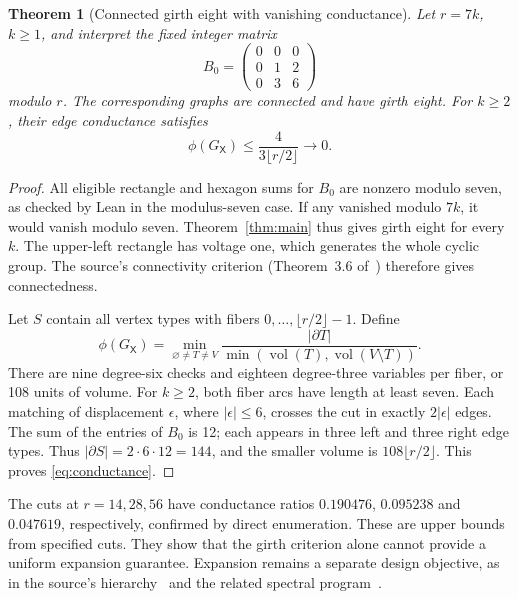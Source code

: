 \documentclass[11pt]{article}
\newtheorem{theorem}{Theorem}[section]
\theoremstyle{definition}
\theoremstyle{remark}
\newcommand{\GX}{G_{\mathsf X}}
\newcommand{\vol}{\operatorname{vol}}
\begin{document}
\begin{theorem}[Connected girth eight with vanishing conductance]
Let $r=7k$, $k\ge1$, and interpret the fixed integer matrix
\begin{equation}\label{eq:baseline}
 B_0=\begin{pmatrix}0&0&0\\0&1&2\\0&3&6\end{pmatrix}
\end{equation}
modulo $r$. The corresponding graphs are connected and have girth eight.
For $k\ge2$, their edge conductance satisfies
\begin{equation}\label{eq:conductance}
 \phi(\GX)\le\frac{4}{3\lfloor r/2\rfloor}\longrightarrow0.
\end{equation}
\end{theorem}
\begin{proof}
All eligible rectangle and hexagon sums for $B_0$ are nonzero modulo seven,
as checked by Lean in the modulus-seven case. If any vanished modulo
$7k$, it would vanish modulo seven. Theorem~\ref{thm:main} thus gives
girth eight for every $k$. The upper-left rectangle has voltage one, which
generates the whole cyclic group. The source's connectivity criterion
(Theorem~3.6 of~\cite{FHM2026}) therefore gives connectedness.

Let $S$ contain all vertex types with fibers
$0,\ldots,\lfloor r/2\rfloor-1$. Define
\[
 \phi(\GX)=\min_{\varnothing\ne T\ne V}
 \frac{|\partial T|}{\min(\vol(T),\vol(V\setminus T))}.
\]
There are nine degree-six checks and eighteen degree-three variables
per fiber, or 108 units of volume. For $k\ge2$, both fiber arcs have
length at least seven. Each matching of displacement $\epsilon$, where
$|\epsilon|\le6$, crosses the cut in exactly $2|\epsilon|$ edges.
The sum of the entries of $B_0$ is 12; each appears in three left and
three right edge types. Thus $|\partial S|=2\cdot6\cdot12=144$, and
the smaller volume is $108\lfloor r/2\rfloor$. This proves
\eqref{eq:conductance}.
\end{proof}

The cuts at $r=14,28,56$ have conductance ratios $0.190476$, $0.095238$
and $0.047619$, respectively, confirmed by direct enumeration. These
are upper bounds from specified cuts. They show that the girth criterion
alone cannot provide a uniform expansion guarantee. Expansion remains
a separate design objective, as in the source's hierarchy~\cite{FHM2026}
and the related spectral program~\cite{AC2026}.
\end{document}
